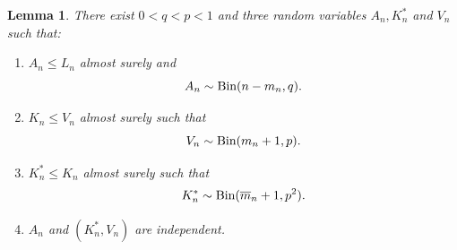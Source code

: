 \documentclass[12pt]{article}
\newcommand{\1}{\mathbf{1}}
\newtheorem{lemma}{Lemma}
\begin{document}
\begin{lemma}\label{lem: coupling}
There exist  $0<q<p<1$ and three random variables $A_n,K_n^*$ and $V_n$ such that:
\begin{enumerate}
    \item[(i)] $A_n\leq L_n$ almost surely and 
    \begin{equation*}
        A_n\sim\text{\normalfont Bin}(n-m_n,q).
    \end{equation*}

    \item[(ii)] $K_n\leq V_n$ almost surely such that 
    \begin{equation*}
    V_n\sim\text{\normalfont Bin}(m_n+1,p).
    \end{equation*}
    \item[(iii)] $K_n^*\leq K_n$ almost surely such that 
   \begin{equation*}
    K_n^*\sim\text{\normalfont Bin}(\overline m_n+1,p^2).
    \end{equation*}
    
     \item[(iv)] $A_n$ and $(K_n^*,V_n)$ are independent.  \end{enumerate}

\end{lemma}
\end{document}
